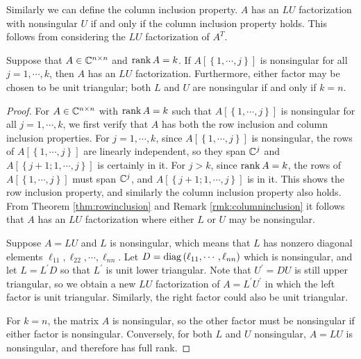 \documentclass[12pt]{article}
\begin{document}
\begin{remark}\label{rmk:columninclusion}
    Similarly we can define the \textnormal{column inclusion property}. \(A\) has an \(LU\) factorization with nonsingular \(U\) if and only if the column inclusion property holds. This follows from considering the \(LU\) factorization of \(A^T\).
\end{remark}

\begin{corollary}\label{cor:LU}
    Suppose that \(A\in\mathbb C^{n\times n}\) and \(\operatorname{rank} A=k\). If \(A\left[\left\{1,\cdots,j\right\}\right]\) is nonsingular for all \(j=1,\cdots,k\), then \(A\) has an \(LU\) factorization. Furthermore, either factor may be chosen to be unit triangular; both \(L\) and \(U\) are nonsingular if and only if \(k=n\).
\end{corollary}
\begin{proof}
    For \(A\in\mathbb C^{n\times n}\) with \(\operatorname{rank} A=k\) such that \(A\left[\left\{1,\cdots,j\right\}\right]\) is nonsingular for all \(j=1,\cdots,k\), we first verify that \(A\) has both the row inclusion and column inclusion properties. For \(j=1,\cdots,k\), since \(A\left[\left\{1,\cdots,j\right\}\right]\) is nonsingular, the rows of \(A\left[\left\{1,\cdots,j\right\}\right]\) are linearly independent, so they span \(\mathbb C^j\) and \(A\left[\left\{j+1;1,\cdots,j\right\}\right]\) is certainly in it. For \(j>k\), since \(\operatorname{rank} A=k\), the rows of \(A\left[\left\{1,\cdots,j\right\}\right]\) must span \(\mathbb C^j\), and \(A\left[\left\{j+1;1,\cdots,j\right\}\right]\) is in it. This shows the row inclusion property, and similarly the column inclusion property also holds. From Theorem \ref{thm:rowinclusion} and Remark \ref{rmk:columninclusion} it follows that \(A\) has an \(LU\) factorization where either \(L\) or \(U\) may be nonsingular.\par
    Suppose \(A=LU\) and \(L\) is nonsingular, which means that \(L\) has nonzero diagonal elements \(\ell_{11},\ell_{22},\cdots,\ell_{nn}\). Let \(D=\operatorname{diag}\left(\ell_{11},\cdots,\ell_{nn}\right)\) which is nonsingular, and let \(L=L^\prime D\) so that \(L^\prime\) is unit lower triangular. Note that \(U^\prime=DU\) is still upper triangular, so we obtain a new \(LU\) factorization of \(A=L^\prime U^\prime\) in which the left factor is unit triangular. Similarly, the right factor could also be unit triangular.\par
    For \(k=n\), the matrix \(A\) is nonsingular, so the other factor must be nonsingular if either factor is nonsingular. Conversely, for both \(L\) and \(U\) nonsingular, \(A=LU\) is nonsingular, and therefore has full rank.
\end{proof}
\end{document}
